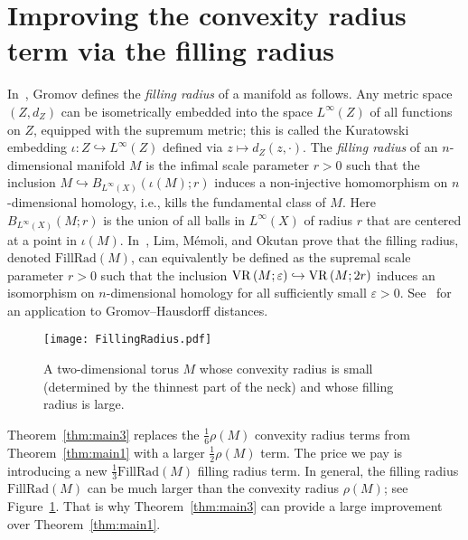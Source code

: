\documentclass[11pt, reqno, english]{amsart}
\def\fr{\mathrm{FillRad}}
\begin{document}
\section{Improving the convexity radius term via the filling radius}
\label{sec:fill-rad}

In~\cite{gromov1983filling}, Gromov defines the \emph{filling radius} of a manifold as follows.
Any metric space $(Z,d_Z)$ can be isometrically embedded into the space $L^\infty(Z)$ of all functions on $Z$, equipped with the supremum metric; this is called the Kuratowski embedding $\iota \colon Z \hookrightarrow L^\infty(Z)$ defined via $z\mapsto d_Z(z,\cdot)$.
The \emph{filling radius} of an $n$-dimensional manifold $M$ is the infimal scale parameter $r>0$ such that the inclusion $M \hookrightarrow B_{L^{\infty}(X)}(\iota(M);r)$ induces a non-injective homomorphism on $n$-dimensional homology, i.e., kills the fundamental class of $M$.
Here $B_{L^{\infty}(X)}(M;r)$ is the union of all balls in $L^\infty(X)$ of radius $r$ that are centered at a point in $\iota(M)$.
In~\cite{lim2020vietoris}, Lim, M\'{e}moli, and Okutan prove that the filling radius, denoted $\fr(M)$, can equivalently be defined as the supremal scale parameter $r>0$ such that the inclusion $\mathrm{VR}\left(M;\varepsilon\right) \hookrightarrow \mathrm{VR}\left(M;2r\right)$ induces an isomorphism on $n$-dimensional homology for all sufficiently small $\varepsilon>0$.
See~\cite[Proposition~9.6]{lim2020vietoris} for an application to Gromov--Hausdorff distances.

\begin{figure}[htb]
\centering
\texttt{[image: FillingRadius.pdf]}
\caption{
A two-dimensional torus $M$ whose convexity radius is small (determined by the thinnest part of the neck) and whose filling radius is large.
}
\label{fig:filling-radius}
\end{figure}

Theorem~\ref{thm:main3} replaces the $\frac{1}{6}\rho(M)$ convexity radius terms from Theorem~\ref{thm:main1} with a larger $\frac{1}{2}\rho(M)$ term.
The price we pay is introducing a new $\frac{1}{3}\fr(M)$ filling radius term.
In general, the filling radius $\fr(M)$ can be much larger than the convexity radius $\rho(M)$; see Figure~\ref{fig:filling-radius}.
That is why Theorem~\ref{thm:main3} can provide a large improvement over Theorem~\ref{thm:main1}.

\vspace{3mm}
\mainThree*
\end{document}
